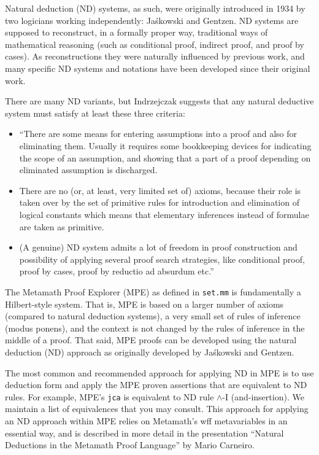 Natural deduction
(ND) systems, as such, were originally introduced in
1934 by two logicians working independently: Jaśkowski and Gentzen. ND
systems are supposed to reconstruct, in a formally proper way, traditional
ways of mathematical reasoning (such as conditional proof, indirect proof,
and proof by cases). As reconstructions they were naturally influenced
by previous work, and many specific ND systems and notations have been
developed since their original work.

There are many ND variants, but
Indrzejczak\cite[p.~31-32]{Indrzejczak}
suggests that any natural deductive system must satisfy at
least these three criteria:

\begin{itemize}
\item ``There are some means for entering assumptions into a proof and
also for eliminating them. Usually it requires some bookkeeping devices
for indicating the scope of an assumption, and showing that a part of
a proof depending on eliminated assumption is discharged.
\item There are no (or, at least, very limited set of) axioms, because
their role is taken over by the set of primitive rules for introduction
and elimination of logical constants which means that elementary
inferences instead of formulae are taken as primitive.
\item (A genuine) ND system admits a lot of freedom in proof construction
and possibility of applying several proof search strategies, like
conditional proof, proof by cases, proof by reductio ad absurdum etc.''
\end{itemize}

The Metamath Proof Explorer (MPE) as defined in \texttt{set.mm}
is fundamentally a Hilbert-style system.
That is, MPE is based on a larger number of axioms (compared
to natural deduction systems), a very small set of rules of inference
(modus ponens), and the context is not changed by the rules of inference
in the middle of a proof. That said, MPE proofs can be developed using
the natural deduction (ND) approach as originally developed by Jaśkowski
and Gentzen.

The most common and recommended approach for applying ND in MPE is to use
deduction form%
and apply the MPE proven assertions that are equivalent to ND rules.
For example, MPE's \texttt{jca} is equivalent to ND rule $\land$-I
(and-insertion).
We maintain a list of equivalences that you may consult.
This approach for applying an ND approach within MPE relies on Metamath's
wff metavariables in an essential way, and is described in more detail
in the presentation ``Natural Deductions in the Metamath Proof Language''
by Mario Carneiro\cite{CarneiroND}.

